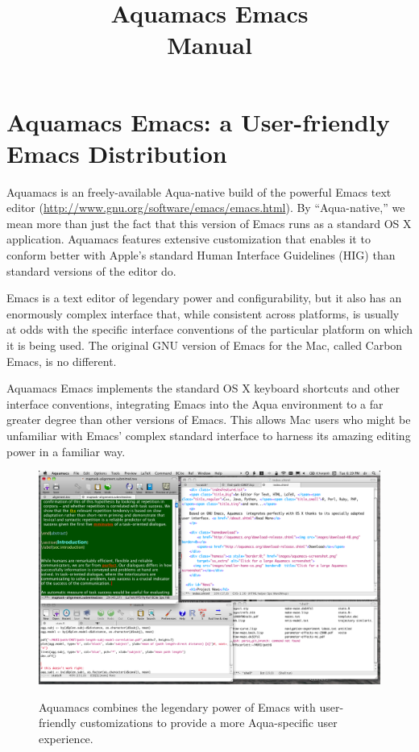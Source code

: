 \documentclass[11pt,letterpaper]{article}
\title{Aquamacs Emacs\\
Manual}
\begin{document}
\sffamily\maketitle 
\rmfamily

\tableofcontents
\pagebreak


\section{Aquamacs Emacs: a User-friendly Emacs Distribution}

Aquamacs is an freely-available Aqua-native build of the powerful
Emacs text editor
(\url{http://www.gnu.org/software/emacs/emacs.html}). By
``Aqua-native,'' we mean more than just the fact that this version of
Emacs runs as a standard OS X application. Aquamacs features extensive
customization that enables it to conform better with Apple's standard
Human Interface Guidelines (HIG) than standard versions of the editor
do.

Emacs is a text editor of legendary power and configurability, but it also has an enormously complex interface that, while consistent across platforms, is usually at odds with the specific interface conventions of the particular platform on which it is being used. The original GNU version of Emacs for the Mac, called Carbon Emacs, is no different.

Aquamacs Emacs implements the standard OS X keyboard shortcuts and other interface conventions, integrating Emacs into the Aqua environment to a far greater degree than other versions of Emacs. This allows Mac users who might be unfamiliar with Emacs' complex standard interface to harness its amazing editing power in a familiar way.

\begin{figure}
\centering
{\includegraphics[width=5in]{aquamacs-screenshot.png}}
\caption{Aquamacs combines the legendary power of Emacs with
  user-friendly customizations to provide a more Aqua-specific user experience.}
\label{aquamacs-screenshot.jpg}
\end{figure}
\end{document}
